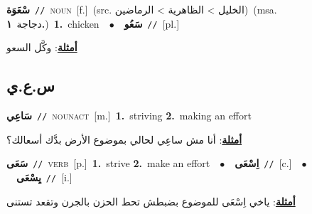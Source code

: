 \documentclass[10pt,a4paper,twoside]{article} %
\begin{document}
\begin{multicols}{2}
{\setlength\topsep{0pt}\textbf{\foreignlanguage{arabic}{سْعَوَة}}\ {\color{gray}\texttt{//}\color{black}}\ \textsc{noun}\ [f.]\ (src. \color{gray}\foreignlanguage{arabic}{الخليل > الظاهرية > الرماضين}\color{black})\ \color{gray}(msa. \foreignlanguage{arabic}{دجاجة}~\foreignlanguage{arabic}{\textbf{١.}})\color{black}\ \textbf{1.}~chicken\ \ $\bullet$\ \ \setlength\topsep{0pt}\textbf{\foreignlanguage{arabic}{سَعُو}}\ {\color{gray}\texttt{//}\color{black}}\ [pl.]\  \begin{flushright}\color{gray}\foreignlanguage{arabic}{\textbf{\underline{\foreignlanguage{arabic}{أمثلة}}}: وكَّل السعو}\end{flushright}\color{black}} \vspace{2mm}

\vspace{-3mm}
\subsection*{\color{blue}\foreignlanguage{arabic}{س.ع.ي}\color{blue}{}} 

{\setlength\topsep{0pt}\textbf{\foreignlanguage{arabic}{سَاعِي}}\ {\color{gray}\texttt{//}\color{black}}\ \textsc{noun\textunderscore act}\ [m.]\ \textbf{1.}~striving  \textbf{2.}~making an effort\  \begin{flushright}\color{gray}\foreignlanguage{arabic}{\textbf{\underline{\foreignlanguage{arabic}{أمثلة}}}: أنا مش ساعِي لحالي بموضوع الأرض بدَّك أسعالك؟}\end{flushright}\color{black}} \vspace{2mm}

{\setlength\topsep{0pt}\textbf{\foreignlanguage{arabic}{سَعَى}}\ {\color{gray}\texttt{//}\color{black}}\ \textsc{verb}\ [p.]\ \textbf{1.}~strive  \textbf{2.}~make an effort\ \ $\bullet$\ \ \setlength\topsep{0pt}\textbf{\foreignlanguage{arabic}{اِسْعَى}}\ {\color{gray}\texttt{//}\color{black}}\ [c.]\ \ $\bullet$\ \ \setlength\topsep{0pt}\textbf{\foreignlanguage{arabic}{يِسْعَى}}\ {\color{gray}\texttt{//}\color{black}}\ [i.]\  \begin{flushright}\color{gray}\foreignlanguage{arabic}{\textbf{\underline{\foreignlanguage{arabic}{أمثلة}}}: ياخي اِسْعَى للموضوع بضبطش تحط الحزن بالجرن وتقعد تستنى}\end{flushright}\color{black}} \vspace{2mm}


\end{multicols}
\end{document}
